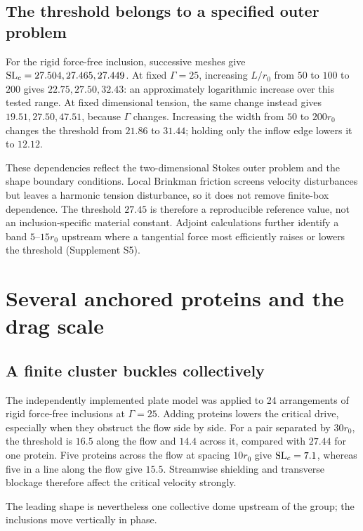 \subsection{The threshold belongs to a specified outer problem}
For the rigid force-free inclusion, successive meshes give $\mathrm{SL}_c=27.504,27.465,27.449$. At fixed $\Gamma=25$, increasing $L/r_0$ from $50$ to $100$ to $200$ gives $22.75,27.50,32.43$: an approximately logarithmic increase over this tested range. At fixed dimensional tension, the same change instead gives $19.51,27.50,47.51$, because $\Gamma$ changes. Increasing the width from $50$ to $200r_0$ changes the threshold from $21.86$ to $31.44$; holding only the inflow edge lowers it to $12.12$.

These dependencies reflect the two-dimensional Stokes outer problem and the shape boundary conditions. Local Brinkman friction screens velocity disturbances but leaves a harmonic tension disturbance, so it does not remove finite-box dependence. The threshold $27.45$ is therefore a reproducible reference value, not an inclusion-specific material constant. Adjoint calculations further identify a band $5$--$15r_0$ upstream where a tangential force most efficiently raises or lowers the threshold (Supplement S5).

\clearpage
\section{Several anchored proteins and the drag scale}
\subsection{A finite cluster buckles collectively}
The independently implemented plate model was applied to 24 arrangements of rigid force-free inclusions at $\Gamma=25$. Adding proteins lowers the critical drive, especially when they obstruct the flow side by side. For a pair separated by $30r_0$, the threshold is $16.5$ along the flow and $14.4$ across it, compared with $27.44$ for one protein. Five proteins across the flow at spacing $10r_0$ give $\mathrm{SL}_c=7.1$, whereas five in a line along the flow give $15.5$. Streamwise shielding and transverse blockage therefore affect the critical velocity strongly.

The leading shape is nevertheless one collective dome upstream of the group; the inclusions move vertically in phase.


